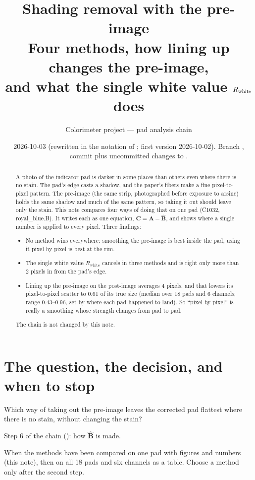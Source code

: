 \documentclass[11pt,letterpaper]{article}
\title{Shading removal with the pre-image\\
\large Four methods, how lining up changes the pre-image,\\
and what the single white value $\Rwhite$ does}
\author{Colorimeter project --- pad analysis chain}
\date{2026-10-03 (rewritten in the notation of \file{analysis\_chain.tex};
first version 2026-10-02).  Branch \file{preimage-capture}, commit
\file{4962604} plus uncommitted changes to
\file{desktop/padanalysis/shading\_review.py}.}
\newcommand{\file}[1]{\texttt{\seqsplit{#1}}}
\newcommand{\mA}{\mathbf{A}}   %
\newcommand{\mC}{\mathbf{C}}   %
\newcommand{\hB}{\widehat{\mathbf{B}}}
\newcommand{\Rwhite}{R_{\text{white}}}
\begin{document}
\maketitle

\begin{abstract}
\noindent
A photo of the indicator pad is darker in some places than others even
where there is no stain.  The pad's edge casts a shadow, and the paper's
fibers make a fine pixel-to-pixel pattern.  The pre-image (the same strip,
photographed before exposure to arsine) holds the same shadow and much of
the same pattern, so taking it out should leave only the stain.  This note
compares four ways of doing that on one pad (C1032, royal\_blue.B).  It
writes each as one equation, $\mC = \mA - \hB$, and shows where a single
number is applied to every pixel.  Three findings:
\begin{itemize}[nosep]
  \item No method wins everywhere: smoothing the pre-image is best inside
    the pad, using it pixel by pixel is best at the rim.
  \item The single white value $\Rwhite$ cancels in three methods and is
    right only more than 2 pixels in from the pad's edge.
  \item Lining up the pre-image on the post-image averages 4 pixels, and
    that lowers its pixel-to-pixel scatter to 0.61 of its true size
    (median over 18 pads and 6 channels; range 0.43--0.96, set by where
    each pad happened to land).  So ``pixel by pixel'' is really a
    smoothing whose strength changes from pad to pad.
\end{itemize}
The chain is not changed by this note.
\end{abstract}

\tableofcontents
\newpage

\section{The question, the decision, and when to stop}

\begin{description}[leftmargin=2em]
  \item[Question.] Which way of taking out the pre-image leaves the
    corrected pad flattest where there is no stain, without changing the
    stain?
  \item[Decision it could change.] Step 6 of the chain
    (\file{analysis\_chain.tex}): how $\hB$ is made.
  \item[When to stop.] When the methods have been compared on one pad
    with figures and numbers (this note), then on all 18 pads and six
    channels as a table.  Choose a method only after the second step.
\end{description}
\end{document}
